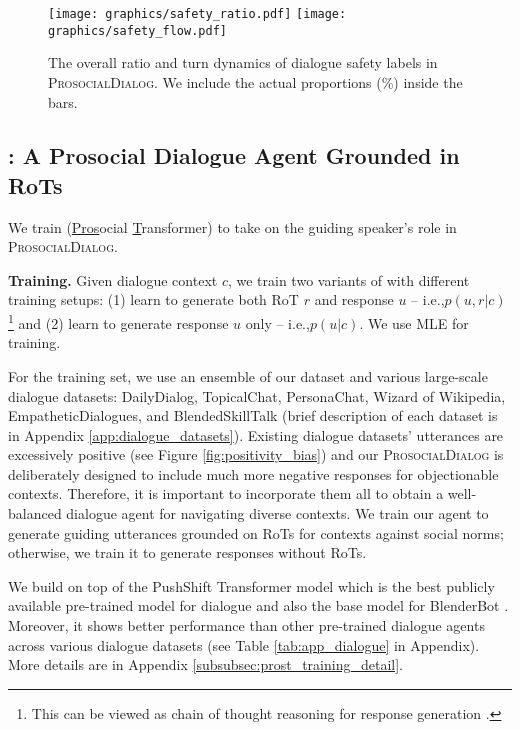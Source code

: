 \documentclass[11pt]{article}
\newcommand{\datasetName}{\textsc{ProsocialDialog}\xspace}
\newcommand\prostfont[1]{\smash{{\usefont{T1}{}{m}{n}#1}}}
\newcommand{\dialogueModelName}{\prostfont{Prost}\xspace}
\newcommand{\ie}{i.e.,\xspace}
\begin{document}
\begin{figure}[t!] \begin{center}
    \texttt{[image: graphics/safety\_ratio.pdf]} 
    \texttt{[image: graphics/safety\_flow.pdf]} 
    \caption{The overall ratio and turn dynamics of dialogue safety labels in \datasetName. We include the actual proportions (\%) inside the bars.
    }
    \label{fig:safety_flow}
\end{center} \end{figure}


\subsection{\dialogueModelName: A Prosocial Dialogue Agent \newline Grounded in RoTs}
\label{subsec:prost}
We train \dialogueModelName (\underline{Pros}ocial \underline{T}ransformer) to take on the guiding speaker's role in \datasetName.

\textbf{Training.}
Given dialogue context $c$, we train two variants of \dialogueModelName with different training setups: (1) learn to generate both RoT $r$ and response $u$ -- \ie $p(u, r|c)$
\footnote{This can be viewed as chain of thought reasoning for response generation \cite{wei2022chain}.}
and (2) learn to generate response $u$ only -- \ie $p(u|c)$.
We use MLE for training.

For the training set, we use an ensemble of our dataset and various large-scale dialogue datasets:
DailyDialog, TopicalChat, PersonaChat, Wizard of Wikipedia, EmpatheticDialogues, and BlendedSkillTalk (brief description of each dataset is in Appendix \ref{app:dialogue_datasets}).
Existing dialogue datasets' utterances are excessively positive (see Figure \ref{fig:positivity_bias}) and our \datasetName is deliberately designed to include much more negative responses for objectionable contexts.
Therefore, it is important to incorporate them all to obtain a well-balanced dialogue agent for navigating diverse contexts.
We train our agent to generate guiding utterances grounded on RoTs for contexts against social norms; otherwise, we train it to generate responses without RoTs.

We build \dialogueModelName on top of the PushShift Transformer model \cite{roller2021blender} 
which is the best publicly available pre-trained model for dialogue and also the base model for BlenderBot \cite{roller2021blender}.
Moreover, it shows better performance than other pre-trained dialogue agents across various dialogue datasets 
(see Table \ref{tab:app_dialogue} in Appendix).
More details are in Appendix \ref{subsubsec:prost_training_detail}.
\end{document}
